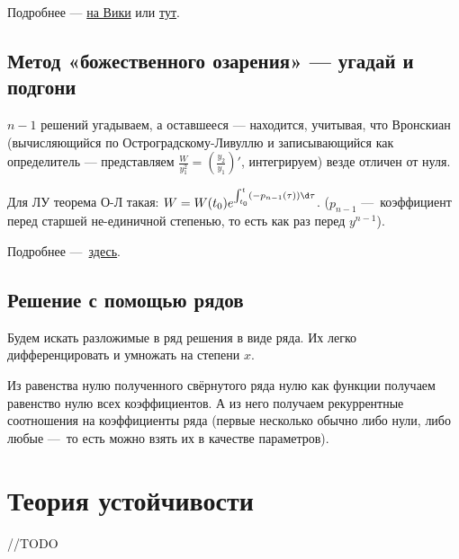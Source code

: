 \documentclass[12pt, a4paper]{article}
\begin{document}
Подробнее — \href{https://en.wikipedia.org/wiki/Variation_of_parameters}{на Вики} 
или \href{https://tutorial.math.lamar.edu/classes/de/VariationofParameters.aspx}{тут}.

\subsection{Метод «божественного озарения» — угадай и подгони}

$n - 1$ решений угадываем, а оставшееся — находится, учитывая, 
что Вронскиан (вычисляющийся по Остроградскому-Ливуллю 
и записывающийся как определитель — 
представляем $\frac{W}{y_1^2} = \left(\frac{y_2}{y_1}\right)'$, интегрируем)
везде отличен от нуля.

Для ЛУ теорема О-Л такая: $W = W(t_0) e^{\int_{t_0}^t (-p_{n-1}(\tau)) \d \tau}$. ($p_{n - 1}$ — коэффициент перед старшей не-единичной степенью, то есть как раз перед $y^{n - 1}$).

Подробнее — \href{https://ru.wikipedia.org/wiki/%D0%A4%D0%BE%D1%80%D0%BC%D1%83%D0%BB%D0%B0_%D0%9B%D0%B8%D1%83%D0%B2%D0%B8%D0%BB%D0%BB%D1%8F_%E2%80%94_%D0%9E%D1%81%D1%82%D1%80%D0%BE%D0%B3%D1%80%D0%B0%D0%B4%D1%81%D0%BA%D0%BE%D0%B3%D0%BE}{здесь}.


\subsection{Решение с помощью рядов}

Будем искать разложимые в ряд решения в виде ряда.
Их легко дифференцировать и умножать на степени $x$.

Из равенства нулю полученного свёрнутого ряда нулю как функции 
получаем равенство нулю всех коэффициентов. 
А из него получаем рекуррентные соотношения на коэффициенты ряда 
(первые несколько обычно либо нули, 
либо любые — то есть можно взять их в качестве параметров).

\section{Теория устойчивости}

//TODO
\end{document}
